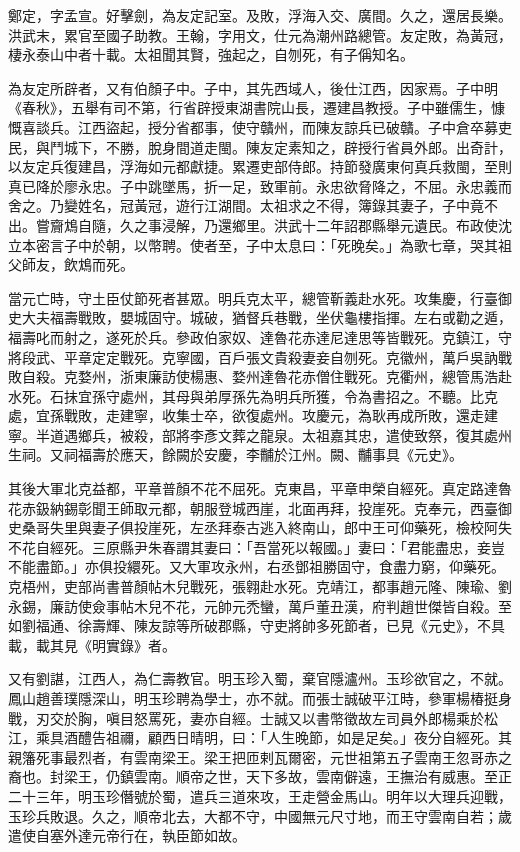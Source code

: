 鄭定，字孟宣。好擊劍，為友定記室。及敗，浮海入交、廣間。久之，還居長樂。洪武末，累官至國子助教。王翰，字用文，仕元為潮州路總管。友定敗，為黃冠，棲永泰山中者十載。太祖聞其賢，強起之，自刎死，有子偁知名。

為友定所辟者，又有伯顏子中。子中，其先西域人，後仕江西，因家焉。子中明《春秋》，五舉有司不第，行省辟授東湖書院山長，遷建昌教授。子中雖儒生，慷慨喜談兵。江西盜起，授分省都事，使守贛州，而陳友諒兵已破贛。子中倉卒募吏民，與鬥城下，不勝，脫身間道走閩。陳友定素知之，辟授行省員外郎。出奇計，以友定兵復建昌，浮海如元都獻捷。累遷吏部侍郎。持節發廣東何真兵救閩，至則真已降於廖永忠。子中跳墜馬，折一足，致軍前。永忠欲脅降之，不屈。永忠義而舍之。乃變姓名，冠黃冠，遊行江湖間。太祖求之不得，簿錄其妻子，子中竟不出。嘗齎鴆自隨，久之事浸解，乃還鄉里。洪武十二年詔郡縣舉元遺民。布政使沈立本密言子中於朝，以幣聘。使者至，子中太息曰：「死晚矣。」為歌七章，哭其祖父師友，飲鴆而死。

當元亡時，守土臣仗節死者甚眾。明兵克太平，總管靳義赴水死。攻集慶，行臺御史大夫福壽戰敗，嬰城固守。城破，猶督兵巷戰，坐伏龜樓指揮。左右或勸之遁，福壽叱而射之，遂死於兵。參政伯家奴、達魯花赤達尼達思等皆戰死。克鎮江，守將段武、平章定定戰死。克寧國，百戶張文貴殺妻妾自刎死。克徽州，萬戶吳訥戰敗自殺。克婺州，浙東廉訪使楊惠、婺州達魯花赤僧住戰死。克衢州，總管馬浩赴水死。石抺宜孫守處州，其母與弟厚孫先為明兵所獲，令為書招之。不聽。比克處，宜孫戰敗，走建寧，收集士卒，欲復處州。攻慶元，為耿再成所敗，還走建寧。半道遇鄉兵，被殺，部將李彥文葬之龍泉。太祖嘉其忠，遣使致祭，復其處州生祠。又祠福壽於應天，餘闕於安慶，李黼於江州。闕、黼事具《元史》。

其後大軍北克益都，平章普顏不花不屈死。克東昌，平章申榮自經死。真定路達魯花赤鈒納錫彰聞王師取元都，朝服登城西崖，北面再拜，投崖死。克奉元，西臺御史桑哥失里與妻子俱投崖死，左丞拜泰古逃入終南山，郎中王可仰藥死，檢校阿失不花自經死。三原縣尹朱春謂其妻曰：「吾當死以報國。」妻曰：「君能盡忠，妾豈不能盡節。」亦俱投繯死。又大軍攻永州，右丞鄧祖勝固守，食盡力窮，仰藥死。克梧州，吏部尚書普顏帖木兒戰死，張翱赴水死。克靖江，都事趙元隆、陳瑜、劉永錫，廉訪使僉事帖木兒不花，元帥元禿蠻，萬戶董丑漢，府判趙世傑皆自殺。至如劉福通、徐壽輝、陳友諒等所破郡縣，守吏將帥多死節者，已見《元史》，不具載，載其見《明實錄》者。

又有劉諶，江西人，為仁壽教官。明玉珍入蜀，棄官隱瀘州。玉珍欲官之，不就。鳳山趙善璞隱深山，明玉珍聘為學士，亦不就。而張士誠破平江時，參軍楊椿挺身戰，刃交於胸，嗔目怒罵死，妻亦自經。士誠又以書幣徵故左司員外郎楊乘於松江，乘具酒醴告祖禰，顧西日晴明，曰：「人生晚節，如是足矣。」夜分自經死。其親籓死事最烈者，有雲南梁王。梁王把匝剌瓦爾密，元世祖第五子雲南王忽哥赤之裔也。封梁王，仍鎮雲南。順帝之世，天下多故，雲南僻遠，王撫治有威惠。至正二十三年，明玉珍僭號於蜀，遣兵三道來攻，王走營金馬山。明年以大理兵迎戰，玉珍兵敗退。久之，順帝北去，大都不守，中國無元尺寸地，而王守雲南自若；歲遣使自塞外達元帝行在，執臣節如故。

